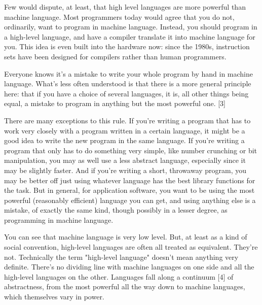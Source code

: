Few would dispute, at least, that high level
                  languages are more powerful than machine language. Most
                  programmers today would agree that you do not, ordinarily,
                  want to program in machine language. Instead, you should
                  program in a high-level language, and have a compiler
                  translate it into machine language for you. This idea is even
                  built into the hardware now: since the 1980s, instruction sets
                  have been designed for compilers rather than human
                  programmers.

Everyone knows it's a mistake to write
                  your whole program by hand in machine language. What's less
                  often understood is that there is a more general principle
                  here: that if you have a choice of several languages, it is,
                  all other things being equal, a mistake to program in anything
                  but the most powerful one. [3]

There are many
                  exceptions to this rule. If you're writing a program that has
                  to work very closely with a program written in a certain
                  language, it might be a good idea to write the new program in
                  the same language. If you're writing a program that only has
                  to do something very simple, like number crunching or bit
                  manipulation, you may as well use a less abstract language,
                  especially since it may be slightly faster. And if you're
                  writing a short, throwaway program, you may be better off just
                  using whatever language has the best library functions for the
                  task. But in general, for application software, you want to be
                  using the most powerful (reasonably efficient) language you
                  can get, and using anything else is a mistake, of exactly the
                  same kind, though possibly in a lesser degree, as programming
                  in machine language.

You can see that machine
                  language is very low level. But, at least as a kind of social
                  convention, high-level languages are often all treated as
                  equivalent. They're not. Technically the term "high-level
                  language" doesn't mean anything very definite. There's no
                  dividing line with machine languages on one side and all the
                  high-level languages on the other. Languages fall along a
                  continuum [4] of abstractness, from the most powerful all the
                  way down to machine languages, which themselves vary in
                  power.

